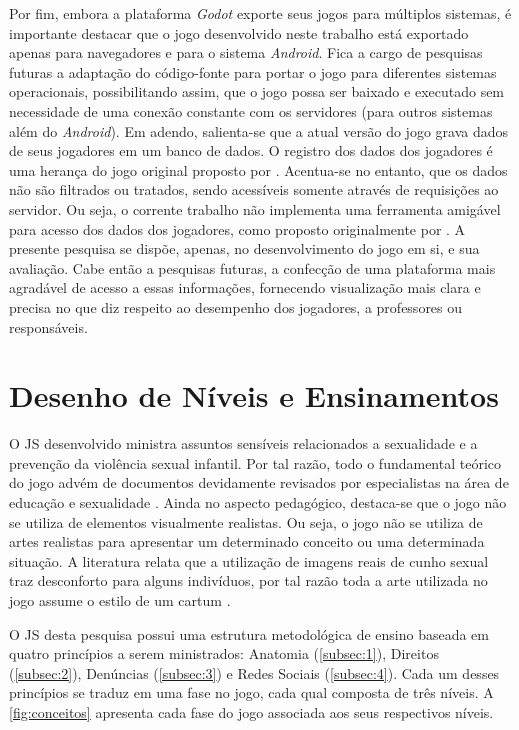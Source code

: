 Por fim, embora a plataforma \textit{Godot} exporte seus jogos para múltiplos sistemas, é importante destacar que o jogo desenvolvido neste trabalho está exportado apenas para navegadores e para o sistema \textit{Android}. Fica a cargo de pesquisas futuras a adaptação do código-fonte para portar o jogo para diferentes sistemas operacionais, possibilitando assim, que o jogo possa ser baixado e executado sem necessidade de uma conexão constante com os servidores (para outros sistemas além do \textit{Android}). Em adendo, salienta-se que a atual versão do jogo grava dados de seus jogadores em um banco de dados. O registro dos dados dos jogadores é uma herança do jogo original proposto por . Acentua-se no entanto, que os dados não são filtrados ou tratados, sendo acessíveis somente através de requisições ao servidor. Ou seja, o corrente trabalho não implementa uma ferramenta amigável para acesso dos dados dos jogadores, como proposto originalmente por . A presente pesquisa se dispõe, apenas, no desenvolvimento do jogo em si, e sua avaliação. Cabe então a pesquisas futuras, a confecção de uma plataforma mais agradável de acesso a essas informações, fornecendo visualização mais clara e precisa no que diz respeito ao desempenho dos jogadores, a professores ou responsáveis.  



\section{Desenho de Níveis e Ensinamentos}\label{sec:DN}

O \acf{JS} desenvolvido ministra assuntos sensíveis relacionados a sexualidade e a prevenção da violência sexual infantil. Por tal razão, todo o fundamental teórico do jogo advém de documentos devidamente revisados por especialistas na área de educação e sexualidade \cite{unesco2018international}. Ainda no aspecto pedagógico, destaca-se que o jogo não se utiliza de elementos visualmente realistas. Ou seja, o jogo não se utiliza de artes realistas para apresentar um determinado conceito ou uma determinada situação. A literatura relata que a utilização de imagens reais de cunho sexual traz desconforto para alguns indivíduos, por tal razão toda a arte utilizada no jogo assume o estilo de um cartum \cite{albert2020desenvolvimento}.

O \ac{JS} desta pesquisa possui uma estrutura metodológica de ensino baseada em quatro princípios a serem ministrados: Anatomia (\autoref{subsec:1}), Direitos (\autoref{subsec:2}), Denúncias (\autoref{subsec:3}) e Redes Sociais (\autoref{subsec:4}). Cada um desses princípios se traduz em uma fase no jogo, cada qual composta de três níveis. A \autoref{fig:conceitos} apresenta cada fase do jogo associada aos seus respectivos níveis.

